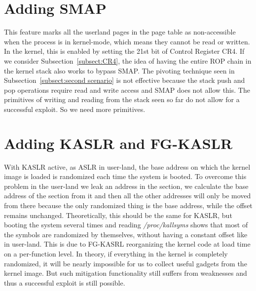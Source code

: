 \documentclass{masterthesis}
\newcommand{\refToSubSection}[1]{Subsection~\ref{subsect:#1}\xspace}
\begin{document}
\section{Adding SMAP}
This feature marks all the userland pages in the page table as non-accessible when the process is in kernel-mode, which means they cannot be read or written.
In the kernel, this is enabled by setting the 21st bit of Control Register CR4.
If we consider \refToSubSection{CR4}, the idea of having the entire ROP chain in the kernel stack also works to bypass SMAP.
The pivoting technique seen in \refToSubSection{second scenario} is not effective because the stack push and pop operations require read and write access and SMAP does not allow this. The primitives of writing and reading from the stack seen so far do not allow for a successful exploit. So we need more primitives.
\section{Adding KASLR and FG-KASLR}
With KASLR active, as ASLR in user-land, the base address on which the kernel image is loaded is randomized each time the system is booted.
To overcome this problem in the user-land we leak an address in the section, we calculate the base address of the section from it and then all the other addresses will only be moved from there because the only randomized thing is the base address, while the offset remains unchanged.
Theoretically, this should be the same for KASLR, but booting the system several times and reading \emph{/proc/kallsyms} shows that most of the symbols are randomized by themselves, without having a constant offset like in user-land.
This is due to FG-KASRL reorganizing the kernel code at load time on a per-function level.
In theory, if everything in the kernel is completely randomized, it will be nearly impossible for us to collect useful gadgets from the kernel image. But such mitigation functionality still suffers from weaknesses and thus a successful exploit is still possible.
\end{document}
